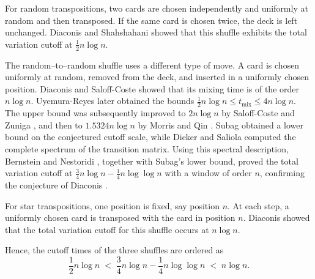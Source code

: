 \documentclass[11pt]{article}
\theoremstyle{plain}  %
\begin{document}
For random transpositions, two cards are chosen independently and uniformly at
random and then transposed. If the same card is chosen twice, the deck is left
unchanged. Diaconis and Shahshahani \cite{Diaconis1981} showed that this
shuffle exhibits the total variation cutoff at
$
\frac{1}{2}n\log n.
$ 

The random--to--random shuffle uses a different type of move. A card is chosen uniformly at random, removed from the deck, and inserted in a uniformly chosen position. Diaconis and Saloff-Coste \cite{DiaconisSaloffCoste1995} showed that its mixing time is of the order $n\log n$. Uyemura-Reyes \cite{UyemuraReyes2002} later obtained the bounds $ 
\frac12 n\log n \leq t_{\mathrm{mix}}\leq 4n\log n.
$ The upper bound was subsequently improved to $2n\log n$ by Saloff-Coste and Zuniga \cite{SaloffCosteZuniga2008}, and then to $1.5324n\log n$ by Morris and Qin \cite{MorrisQin2017}. Subag \cite{Subag} obtained a lower bound on the conjectured cutoff scale, while Dieker and Saliola \cite{Dieker2018} computed the complete spectrum of the transition matrix. Using this spectral description, Bernstein and Nestoridi \cite{bernstein2019cutoff}, together with Subag's lower bound, proved the total variation cutoff at $
\frac34 n\log n-\frac14 n\log\log n
$ with a window of order $n$, confirming the conjecture of Diaconis \cite{Diaconis2003}.



For star transpositions, one position is fixed, say position $n$. At each
step, a uniformly chosen card is transposed with the card in position $n$.
Diaconis \cite{PFlour} showed that the total variation cutoff for this shuffle
occurs at
$
n\log n.
$

Hence, the cutoff times of the three shuffles are ordered as
\[
\frac{1}{2}n\log n
\;<\;
\frac{3}{4}n\log n-\frac{1}{4}n\log\log n
\;<\;
n\log n.
\]
\end{document}
